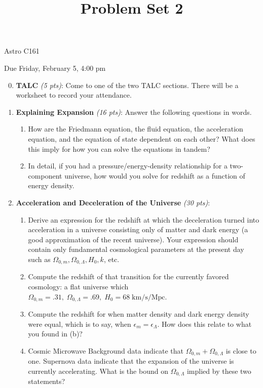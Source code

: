 \documentclass[12pt,preprint]{aastex}
\title{Problem Set 2}
\begin{document}
\maketitle
\centerline{Astro C161} 

\centerline{Due Friday, February 5, 4:00 pm}

\begin{enumerate}
\setcounter{enumi}{-1}

\item \textbf{TALC} \textit{(5 pts)}: Come to one of the two TALC sections. There will be a worksheet to record your attendance.

\item \textbf{Explaining Expansion} \textit{(16 pts)}: Answer the following questions in words.
\begin{enumerate}
	\item How are the Friedmann equation, the fluid equation, the acceleration equation, and the equation of state dependent on each other? What does this imply for how you can solve the equations in tandem?  
	\item In detail, if you had a pressure/energy-density relationship for a two-component universe, how would you solve for redshift as a function of energy density.
\end{enumerate}

\item \textbf{Acceleration and Deceleration of the Universe} \textit{(30 pts)}: 
	\begin{enumerate}
	\item Derive an expression for the redshift at which the deceleration turned into acceleration in a universe consisting
only of matter and dark energy (a good approximation of the recent universe). Your expression should contain only fundamental cosmological parameters at the present day such as $\Omega_{0,m}, \Omega_{0,\Lambda}, H_0, k$, etc. 
	\item Compute the redshift of that transition for the currently favored cosmology: a flat universe which $\Omega_{0,m} = .31,\; \Omega_{0,\Lambda} = .69,\; H_0 = 68\;\mathrm{km/s/Mpc} $.
	\item Compute the redshift for when matter density and dark energy density were equal, which is to say, when $\epsilon_m = \epsilon_\Lambda $. How does this relate to what you found in (b)?
    \item Cosmic Microwave Background data indicate that $\Omega_{0,m}+\Omega_{0,\Lambda}$ is close to one. Supernova 
data indicate that the expansion of the universe is currently accelerating. What is the bound on $\Omega_{0,\Lambda}$ implied by these two statements?
	\end{enumerate}


\end{enumerate}
\end{document}

